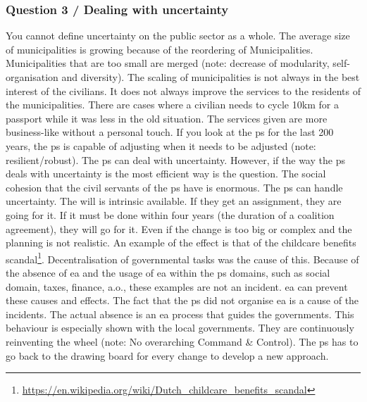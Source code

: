 \subsubsection{Question 3 / Dealing with uncertainty}
You cannot define uncertainty on the public sector as a whole. The average size of municipalities is growing because of the reordering of Municipalities. Municipalities that are too small are merged (note: decrease of modularity, self-organisation and diversity). The scaling of municipalities is not always in the best interest of the civilians. It does not always improve the services to the residents of the municipalities. There are cases where a civilian needs to cycle 10km for a passport while it was less in the old situation. The services given are more business-like without a personal touch. If you look at the \gls{ps} for the last 200 years, the \gls{ps} is capable of adjusting when it needs to be adjusted (note: resilient/robust). The \gls{ps} can deal with uncertainty. However, if the way the \gls{ps} deals with uncertainty is the most efficient way is the question. The social cohesion that the civil servants of the \gls{ps} have is enormous. The \gls{ps} can handle uncertainty. The will is intrinsic available. If they get an assignment, they are going for it. If it must be done within four years (the duration of a coalition agreement), they will go for it. Even if the change is too big or complex and the planning is not realistic.
An example of the effect is that of the childcare benefits scandal\footnote{\url{https://en.wikipedia.org/wiki/Dutch_childcare_benefits_scandal}}. Decentralisation of governmental tasks was the cause of this. Because of the absence of \gls{ea} and the usage of \gls{ea} within the \acrshort{ps} domains, such as social domain, taxes, finance, a.o., these examples are not an incident. \gls{ea} can prevent these causes and effects. The fact that the \gls{ps} did not organise \gls{ea} is a cause of the incidents. The actual absence is an \gls{ea} process that guides the governments. This behaviour is especially shown with the local governments. They are continuously reinventing the wheel (note: No overarching Command \& Control). The \gls{ps} has to go back to the drawing board for every change to develop a new approach.

